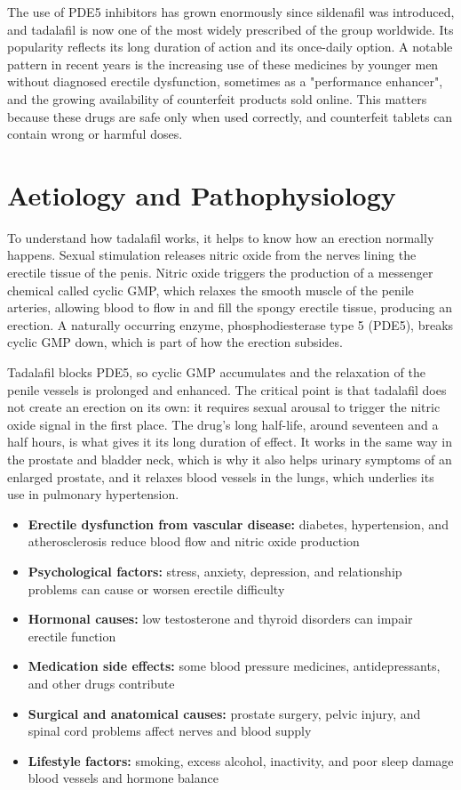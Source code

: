 The use of PDE5 inhibitors has grown enormously since sildenafil was introduced, and tadalafil is now one of the most widely prescribed of the group worldwide. Its popularity reflects its long duration of action and its once-daily option. A notable pattern in recent years is the increasing use of these medicines by younger men without diagnosed erectile dysfunction, sometimes as a "performance enhancer", and the growing availability of counterfeit products sold online. This matters because these drugs are safe only when used correctly, and counterfeit tablets can contain wrong or harmful doses.

\section*{Aetiology and Pathophysiology}
To understand how tadalafil works, it helps to know how an erection normally happens. Sexual stimulation releases nitric oxide from the nerves lining the erectile tissue of the penis. Nitric oxide triggers the production of a messenger chemical called cyclic GMP, which relaxes the smooth muscle of the penile arteries, allowing blood to flow in and fill the spongy erectile tissue, producing an erection. A naturally occurring enzyme, phosphodiesterase type 5 (PDE5), breaks cyclic GMP down, which is part of how the erection subsides.

Tadalafil blocks PDE5, so cyclic GMP accumulates and the relaxation of the penile vessels is prolonged and enhanced. The critical point is that tadalafil does not create an erection on its own: it requires sexual arousal to trigger the nitric oxide signal in the first place. The drug's long half-life, around seventeen and a half hours, is what gives it its long duration of effect. It works in the same way in the prostate and bladder neck, which is why it also helps urinary symptoms of an enlarged prostate, and it relaxes blood vessels in the lungs, which underlies its use in pulmonary hypertension.

\begin{itemize}
    \item \textbf{Erectile dysfunction from vascular disease:} diabetes, hypertension, and atherosclerosis reduce blood flow and nitric oxide production
    \item \textbf{Psychological factors:} stress, anxiety, depression, and relationship problems can cause or worsen erectile difficulty
    \item \textbf{Hormonal causes:} low testosterone and thyroid disorders can impair erectile function
    \item \textbf{Medication side effects:} some blood pressure medicines, antidepressants, and other drugs contribute
    \item \textbf{Surgical and anatomical causes:} prostate surgery, pelvic injury, and spinal cord problems affect nerves and blood supply
    \item \textbf{Lifestyle factors:} smoking, excess alcohol, inactivity, and poor sleep damage blood vessels and hormone balance
\end{itemize}


